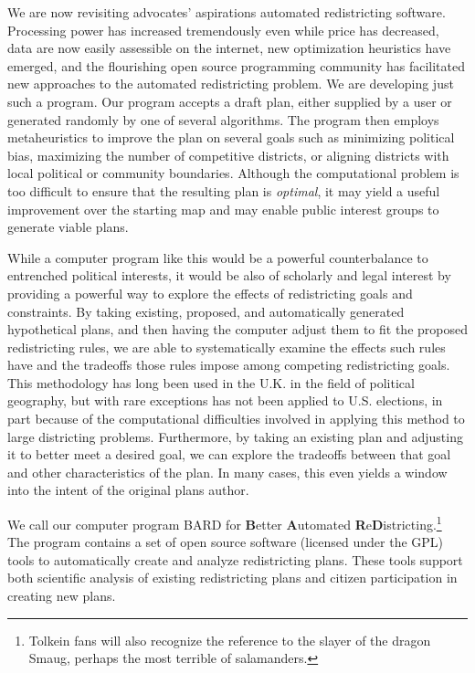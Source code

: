 \documentclass[article]{JSSstyle/jss}
\begin{document}
We are now revisiting advocates' aspirations automated redistricting software.  
Processing power has increased tremendously even while price has 
decreased, data are now easily assessible on the internet, new
optimization heuristics have emerged, and the flourishing
open source programming community has facilitated
new approaches to the automated redistricting problem. We are developing 
just such a program.  Our program accepts a draft plan, either supplied by a user or generated randomly by one of several algorithms.  The program then employs metaheuristics to improve the plan on several 
goals such as minimizing political bias, maximizing the 
number of competitive districts, or aligning districts with local political or community 
boundaries. Although the computational problem is too difficult
to ensure that the resulting plan is \emph{optimal}, it may yield a useful
improvement over the starting map and may enable public interest groups to generate viable plans. 

While a computer program like this would be a powerful counterbalance to entrenched political interests, it would be also of scholarly and legal interest by providing a powerful way to 
explore the effects of redistricting goals and constraints. By taking  
existing, proposed, and automatically generated hypothetical plans, 
and then having the computer adjust them to fit the 
proposed redistricting rules, we are able to systematically 
examine the effects such rules have and the tradeoffs 
those rules impose among competing redistricting goals. 
This methodology has long been used in the U.K. in the field of political 
geography, but with rare exceptions has not been applied to U.S. 
elections, in part because of the computational difficulties 
involved in applying this method to large districting problems. Furthermore, 
by taking an existing plan and adjusting it to better meet a
desired goal, we can explore the tradeoffs between that goal and other characteristics of 
the plan.  In many cases, this even yields a window into the intent 
of the original plans author. 

We call our computer program BARD for \textbf{B}etter \textbf{A}utomated 
\textbf{R}e\textbf{D}istricting.\footnote{Tolkein fans will also recognize the 
reference to the slayer of the dragon Smaug, perhaps the most 
terrible of salamanders.} The program contains a set of open source software (licensed under the GPL)
tools to automatically create and analyze redistricting plans. These 
tools support both scientific analysis of existing redistricting 
plans and citizen participation in creating new plans.
\end{document}
